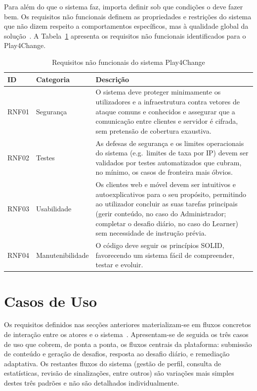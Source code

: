 Para além do que o sistema faz, importa definir sob que condições o deve fazer bem. Os requisitos não funcionais definem as propriedades e restrições do sistema que não dizem respeito a comportamentos específicos, mas à qualidade global da solução~\cite{bass2021}.
A Tabela~\ref{tab:rnf} apresenta os requisitos não funcionais identificados para o Play4Change.

\begin{table}[H]
\centering
\caption{Requisitos não funcionais do sistema Play4Change}
\label{tab:rnf}
\begin{tabular}{p{1.3cm}p{3cm}p{8.5cm}}
\hline
\textbf{ID} & \textbf{Categoria} & \textbf{Descrição} \\
\hline
RNF01 & Segurança       & O sistema deve proteger minimamente os utilizadores e a infraestrutura contra vetores de ataque comuns e conhecidos e assegurar que a comunicação entre clientes e servidor é cifrada, sem pretensão de cobertura exaustiva. \\
RNF02 & Testes          & As defesas de segurança e os limites operacionais do sistema (e.g.\ limites de taxa por IP) devem ser validados por testes automatizados que cubram, no mínimo, os casos de fronteira mais óbvios. \\
RNF03 & Usabilidade     & Os clientes web e móvel devem ser intuitivos e autoexplicativos para o seu propósito, permitindo ao utilizador concluir as suas tarefas principais (gerir conteúdo, no caso do Administrador; completar o desafio diário, no caso do Learner) sem necessidade de instrução prévia. \\
RNF04 & Manutenibilidade & O código deve seguir os princípios SOLID, favorecendo um sistema fácil de compreender, testar e evoluir. \\
\hline
\end{tabular}
\end{table}

\section{Casos de Uso} \label{sec:casosdeuso}

Os requisitos definidos nas secções anteriores materializam-se em fluxos concretos de interação entre os atores e o sistema~\cite{jacobson1992}.
Apresentam-se de seguida os três casos de uso que cobrem, de ponta a ponta, os fluxos centrais da plataforma: submissão de conteúdo e geração de desafios, resposta ao desafio diário, e remediação adaptativa. Os restantes fluxos do sistema (gestão de perfil, consulta de estatísticas, revisão de sinalizações, entre outros) são variações mais simples destes três padrões e não são detalhados individualmente.


